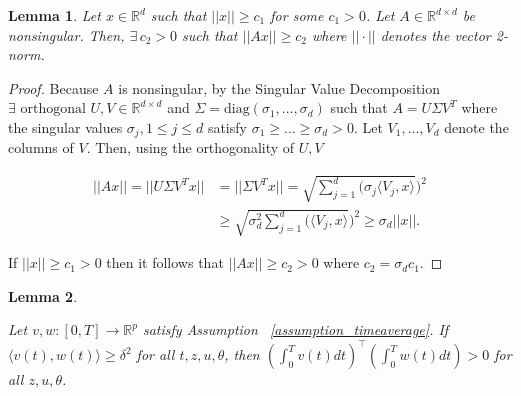 \documentclass[letterpaper, 10 pt, conference]{ieeeconf}  %
\newtheorem{lemma}{Lemma}
\begin{document}
\begin{lemma}
    Let $x \in \mathbb{R}^d$ such that $||x|| \geq c_1$ for some $c_1 > 0$. Let $A \in \mathbb{R}^{d \times d}$ be nonsingular. Then, $\exists\,  c_2 > 0$ such that $||Ax|| \geq c_2$ where $||\cdot||$ denotes the vector 2-norm.
\end{lemma}
\begin{proof}
    Because $A$ is nonsingular, by the Singular Value Decomposition $\exists \text{ orthogonal }U,V \in \mathbb{R}^{d \times d}$ and $\Sigma = \text{diag}(\sigma_1,...,\sigma_d)$ such that $A = U \Sigma V^T$ where the singular values $\sigma_j, 1 \leq j \leq d$ satisfy $\sigma_1 \geq ... \geq \sigma_d > 0$. Let $V_1,...,V_d$ denote the columns of $V$. Then, using the orthogonality of $U,V$
\begin{small}
\begin{align*}
    ||Ax|| =  ||U\Sigma V^Tx|| &= ||\Sigma V^Tx|| 
    = \sqrt{\sum_{j=1}^{d}(\sigma_j\langle V_j,x\rangle})^2  
    \\
    &\geq \sqrt{\sigma_{d}^{2}\sum_{j=1}^{d}(\langle V_j,x\rangle})^2  \geq \sigma_d ||x||.
\end{align*}
\end{small}
If $||x|| \geq c_1 > 0$ then it follows that $||Ax|| \geq c_2 > 0$ where $c_2 = \sigma_dc_1$. 
\end{proof}

\newcommand{\lemmaPositiveIntegralProduct}[1]{ 
Let $v,w: [0,T] \rightarrow \mathbb{R}^p$ satisfy Assumption ~\ref{assumption_timeaverage}. If $\langle v(t), w(t) \rangle \geq \delta^2$ for all $t,z,u,\theta$, then $\left(\int_{0}^{T}v(t)dt\right)^\top \left(\int_{0}^{T}w(t)dt\right) > 0$ for all $z,u,\theta$.}  
\begin{lemma}
\label{lemma:positive_integral_product}
\lemmaPositiveIntegralProduct{main}
\end{lemma}
\end{document}
